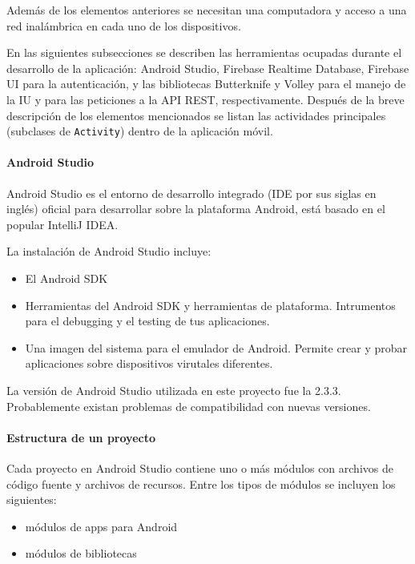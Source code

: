 Además de los elementos anteriores se necesitan una computadora y acceso a una red inalámbrica
en cada uno de los dispositivos.

En las siguientes subsecciones se describen las herramientas ocupadas durante 
el desarrollo de la aplicación:
Android Studio, Firebase Realtime
Database, Firebase UI para la autenticación, y las bibliotecas Butterknife
y Volley para el manejo de la IU y para las peticiones a la API REST,
respectivamente. Después de la breve descripción de los elementos
mencionados se listan las actividades principales (subclases de \texttt{Activity}) dentro de la aplicación móvil.


\paragraph{Android Studio}
\label{\detokenize{dev_docs:android-studio}}
Android Studio es el entorno de desarrollo integrado (IDE por sus siglas en
inglés) oficial para desarrollar sobre la plataforma Android, está basado en
el popular IntelliJ IDEA.

La instalación de Android Studio incluye:
\begin{itemize}
\item {} 
El Android SDK

\item {} 
Herramientas del Android SDK y herramientas de plataforma. Intrumentos para el debugging y el testing de tus aplicaciones.

\item {} 
Una imagen del sistema para el emulador de Android. Permite crear y probar aplicaciones sobre dispositivos virutales diferentes.

\end{itemize}

La versión de Android Studio utilizada en este proyecto fue la 2.3.3. Probablemente
existan problemas de compatibilidad con nuevas versiones.


\paragraph{Estructura de un proyecto}
\label{\detokenize{dev_docs:estructura-de-un-proyecto}}
Cada proyecto en Android Studio contiene uno o más módulos con archivos de código fuente y archivos de recursos. Entre los tipos de módulos se incluyen los siguientes:
\begin{itemize}
\item {} 
módulos de apps para Android

\item {} 
módulos de bibliotecas


\end{itemize}

